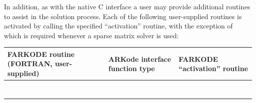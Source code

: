 \documentclass[letterpaper,10pt,english]{sphinxmanual}
\begin{document}
In addition, as with the native C interface a user may provide
additional routines to assist in the solution process.  Each of the
following user-supplied routines is activated by calling the specified
``activation'' routine, with the exception of {\hyperref[f_interface/Usage:f/_/FARKSPJAC]{\emph{}}}
which is required whenever a sparse matrix solver is used:

\begin{tabulary}{\linewidth}{|L|L|L|}
\hline
\textsf{\relax 
FARKODE routine
(FORTRAN, user-supplied)
} & \textsf{\relax 
ARKode interface
function type
} & \textsf{\relax 
FARKODE ``activation'' routine
}\\
\hline
{\hyperref[f_interface/Usage:f/_/FARKDJAC]{\emph{}}}
 & 
{\hyperref[c_interface/User_supplied:c.ARKDlsDenseJacFn]{\emph{}}}
 & 
{\hyperref[f_interface/Usage:f/_/FARKDENSESETJAC]{\emph{}}}
\\
\hline
{\hyperref[f_interface/Usage:f/_/FARKDMASS]{\emph{}}}
 & 
{\hyperref[c_interface/User_supplied:c.ARKDlsDenseMassFn]{\emph{}}}
 & 
{\hyperref[f_interface/Usage:f/_/FARKDENSESETMASS]{\emph{}}}
\\
\hline
{\hyperref[f_interface/Usage:f/_/FARKBJAC]{\emph{}}}
 & 
{\hyperref[c_interface/User_supplied:c.ARKDlsBandJacFn]{\emph{}}}
 & 
{\hyperref[f_interface/Usage:f/_/FARKBANDSETJAC]{\emph{}}}
\\
\hline
{\hyperref[f_interface/Usage:f/_/FARKBMASS]{\emph{}}}
 & 
{\hyperref[c_interface/User_supplied:c.ARKDlsBandMassFn]{\emph{}}}
 & 
{\hyperref[f_interface/Usage:f/_/FARKBANDSETMASS]{\emph{}}}
\\
\hline
{\hyperref[f_interface/Usage:f/_/FARKSPJAC]{\emph{}}}
 & 
{\hyperref[c_interface/User_supplied:c.ARKSlsSparseJacFn]{\emph{}}}
 & 
{\hyperref[f_interface/Usage:f/_/FARKSPARSESETJAC]{\emph{}}}
\\
\hline
{\hyperref[f_interface/Usage:f/_/FARKSPMASS]{\emph{}}}
 & 
{\hyperref[c_interface/User_supplied:c.ARKSlsSparseMassFn]{\emph{}}}
 & 
{\hyperref[f_interface/Usage:f/_/FARKSPARSESETMASS]{\emph{}}}
\\
\hline
{\hyperref[f_interface/Usage:f/_/FARKPSET]{\emph{}}}

\end{tabulary}
\end{document}
